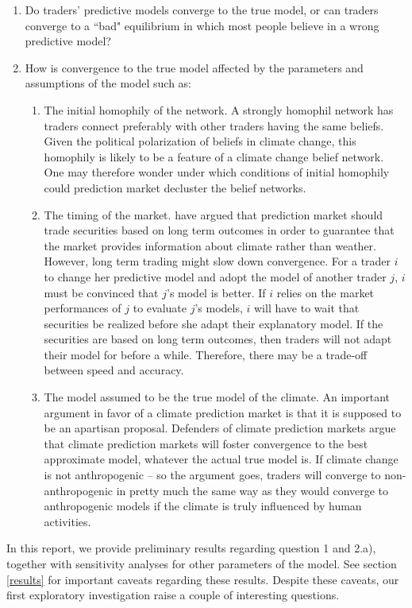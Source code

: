 \documentclass{sig-alternate}
\begin{document}
\begin{enumerate}
	\item Do traders' predictive models converge to the true model, or can traders converge to a ``bad" equilibrium in which most people believe in a wrong predictive model?
	\item How is convergence to the true model affected by the parameters and assumptions of the model such as:
	\begin{enumerate}
		 \item The initial homophily of the network. A strongly homophil network has traders connect preferably with other traders having the same beliefs. Given the political polarization of beliefs in climate change, this homophily is likely to be a feature of a climate change belief network. One may therefore wonder under which conditions of initial homophily could prediction market decluster the belief networks.
		 \item The timing of the market. \cite{Vandenbergh2013f} have argued that prediction market should trade securities based on long term outcomes in order to guarantee that the market provides information about climate rather than weather. However, long term trading might slow down convergence. For a trader $i$ to change her predictive model and adopt the model of another trader $j$, $i$ must be convinced  that $j$'s model is better. If $i$ relies on the market performances of $j$ to evaluate $j$'s models, $i$ will have to wait that securities be realized before she adapt their explanatory model. If the securities are based on long term outcomes, then traders will not adapt their model for before a while. Therefore, there may be a trade-off between speed and accuracy. 
		 \item The model assumed to be the true model of the climate. An important argument in favor of a climate prediction market is that it is supposed to be an apartisan proposal. Defenders of climate prediction markets argue that climate prediction markets will foster convergence to the best approximate model, whatever the actual true model is. If climate change is not anthropogenic -- so the argument goes, traders will converge to non-anthropogenic in pretty much the same way as they would converge to anthropogenic models if the climate is truly influenced by human activities. 
	\end{enumerate}
\end{enumerate}

In this report, we provide preliminary results regarding question 1 and 2.a), together with sensitivity analyses for other parameters of the model. See section \ref{results} for important caveats regarding these results. Despite these caveats, our first exploratory investigation raise a couple of interesting questions. 
\end{document}
